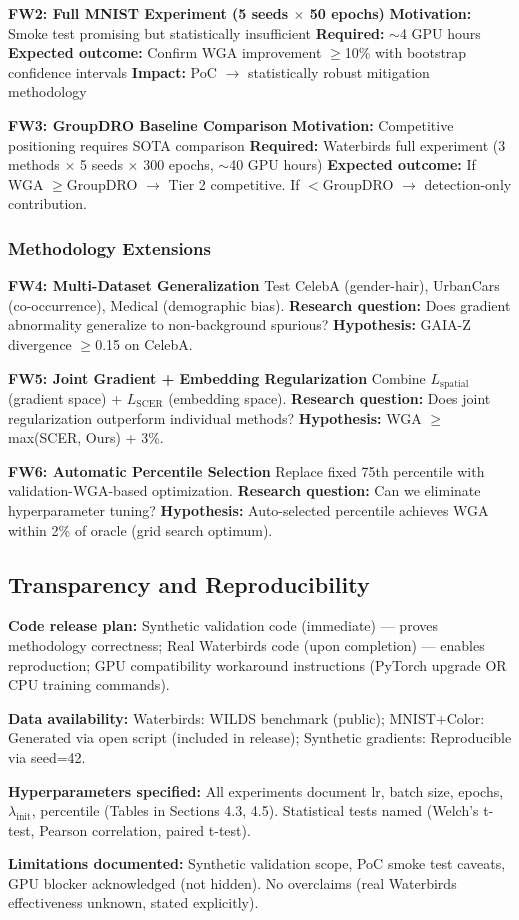 \textbf{FW2: Full MNIST Experiment (5 seeds $\times$ 50 epochs)}
\textbf{Motivation:} Smoke test promising but statistically insufficient
\textbf{Required:} $\sim$4 GPU hours
\textbf{Expected outcome:} Confirm WGA improvement $\geq$10\% with bootstrap confidence intervals
\textbf{Impact:} PoC $\rightarrow$ statistically robust mitigation methodology

\textbf{FW3: GroupDRO Baseline Comparison}
\textbf{Motivation:} Competitive positioning requires SOTA comparison
\textbf{Required:} Waterbirds full experiment (3 methods $\times$ 5 seeds $\times$ 300 epochs, $\sim$40 GPU hours)
\textbf{Expected outcome:} If WGA $\geq$GroupDRO $\rightarrow$ Tier 2 competitive. If $<$GroupDRO $\rightarrow$ detection-only contribution.

\subsubsection{Methodology Extensions}

\textbf{FW4: Multi-Dataset Generalization}
Test CelebA (gender-hair), UrbanCars (co-occurrence), Medical (demographic bias). \textbf{Research question:} Does gradient abnormality generalize to non-background spurious? \textbf{Hypothesis:} GAIA-Z divergence $\geq$0.15 on CelebA.

\textbf{FW5: Joint Gradient + Embedding Regularization}
Combine $L_{\text{spatial}}$ (gradient space) + $L_{\text{SCER}}$ (embedding space). \textbf{Research question:} Does joint regularization outperform individual methods? \textbf{Hypothesis:} WGA $\geq$ max(SCER, Ours) + 3\%.

\textbf{FW6: Automatic Percentile Selection}
Replace fixed 75th percentile with validation-WGA-based optimization. \textbf{Research question:} Can we eliminate hyperparameter tuning? \textbf{Hypothesis:} Auto-selected percentile achieves WGA within 2\% of oracle (grid search optimum).

\subsection{Transparency and Reproducibility}

\textbf{Code release plan:}
Synthetic validation code (immediate) --- proves methodology correctness;
Real Waterbirds code (upon completion) --- enables reproduction;
GPU compatibility workaround instructions (PyTorch upgrade OR CPU training commands).

\textbf{Data availability:}
Waterbirds: WILDS benchmark (public);
MNIST+Color: Generated via open script (included in release);
Synthetic gradients: Reproducible via seed=42.

\textbf{Hyperparameters specified:} All experiments document lr, batch size, epochs, $\lambda_{\text{init}}$, percentile (Tables in Sections 4.3, 4.5). Statistical tests named (Welch's t-test, Pearson correlation, paired t-test).

\textbf{Limitations documented:} Synthetic validation scope, PoC smoke test caveats, GPU blocker acknowledged (not hidden). No overclaims (real Waterbirds effectiveness unknown, stated explicitly).
